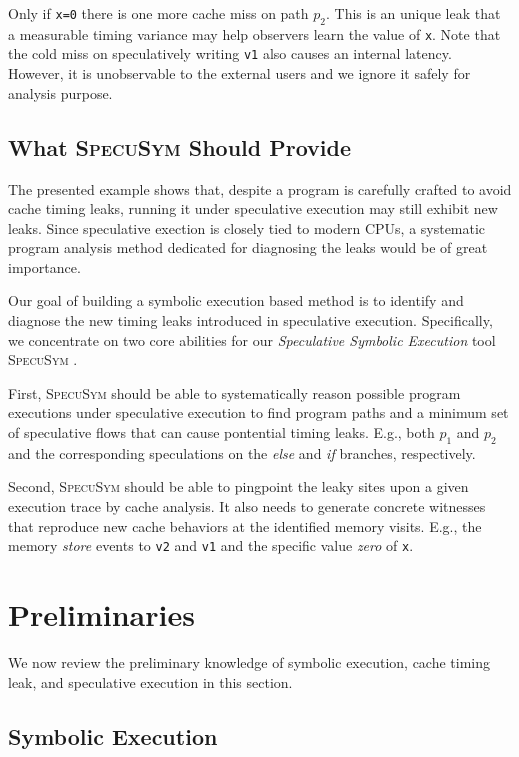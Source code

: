 \documentclass[sigconf, review]{acmart}
\newcommand{\SpecuSym}{\textsc{SpecuSym} }
\begin{document}
Only if \texttt{x=0} there is one more cache miss on path $p_2$. This is an 
unique leak that a measurable timing variance may help observers learn the 
value of \texttt{x}. Note that the cold miss on speculatively writing \texttt{v1} 
also causes an internal latency. However, it is unobservable to the external 
users and we ignore it safely for analysis purpose.


\subsection{What \SpecuSym Should Provide}
\label{sec:app-scenarios}

The presented example shows that, despite a program is carefully crafted to 
avoid cache timing leaks, running it under speculative execution may still 
exhibit new leaks. Since speculative exection is closely tied to modern 
CPUs, a systematic program analysis method dedicated for diagnosing 
the leaks would be of great importance. 


Our goal of building a symbolic execution based method is to identify and 
diagnose the new timing leaks introduced in speculative execution. Specifically, 
we concentrate on two core abilities for our \emph{Speculative Symbolic Execution} 
tool \SpecuSym.


First, \SpecuSym should be able to systematically reason possible program 
executions under speculative execution to find program paths and a minimum 
set of speculative flows that can cause pontential timing leaks. E.g., both 
$\mathit{p_1}$ and $\mathit{p_2}$ and the corresponding speculations on 
the \textit{else} and \textit{if} branches, respectively.

Second, \SpecuSym should be able to pingpoint the leaky sites upon a given 
execution trace by cache analysis. It also needs to generate concrete
witnesses that reproduce new cache behaviors at the identified memory visits. 
E.g., the memory \textit{store} events to \texttt{v2} and \texttt{v1} and the 
specific value \textit{zero} of \texttt{x}.


\section{Preliminaries}
\label{sec:prelim}

We now review the preliminary knowledge of symbolic execution, cache timing 
leak, and speculative execution in this section.


\subsection{Symbolic Execution}
\label{sec:se}
\end{document}
